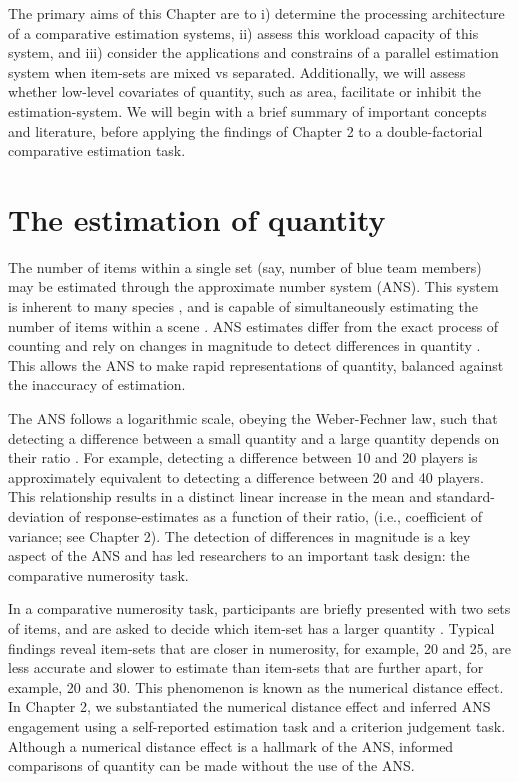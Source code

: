 The primary aims of this Chapter are to i) determine the processing architecture of a comparative estimation systems, ii) assess this workload capacity of this system, and iii) consider the applications and constrains of a parallel estimation system when item-sets are mixed vs separated. Additionally, we will assess whether low-level covariates of quantity, such as area, facilitate or inhibit the estimation-system. We will begin with a brief summary of important concepts and literature, before applying the findings of Chapter 2 to a double-factorial comparative estimation task. 

\section{The estimation of quantity}
The number of items within a single set (say, number of blue team members) may be estimated through the approximate number system (ANS). This system is inherent to many species \cite{woodruff1981primative,pepperberg2005number,agrillo2008fish,dehaene2011NumSense}, and is capable of simultaneously estimating the number of items within a scene \cite{gallistel1992ANS,dehaene2011NumSense}. ANS estimates differ from the exact process of counting and rely on changes in magnitude to detect differences in quantity \cite{gallistel1992ANS}. This allows the ANS to make rapid representations of quantity, balanced against the inaccuracy of estimation. 

The ANS follows a logarithmic scale, obeying the Weber-Fechner law, such that detecting a difference between a small quantity and a large quantity depends on their ratio \cite{fechner1860}. For example, detecting a difference between 10 and 20 players is approximately equivalent to detecting a difference between 20 and 40 players. This relationship results in a distinct linear increase in the mean and standard-deviation of response-estimates as a function of their ratio, (i.e., coefficient of variance; see Chapter 2). The detection of differences in magnitude is a key aspect of the ANS and has led researchers to an important task design: the comparative numerosity task.

In a comparative numerosity task, participants are briefly presented with two sets of items, and are asked to decide which item-set has a larger quantity \cite{piazza2004,price2012,libertus2016, leibovich2014comparing,pansky2002comparative}. Typical findings reveal item-sets that are closer in numerosity, for example, 20 and 25, are less accurate and slower to estimate than item-sets that are further apart, for example, 20 and 30. This phenomenon is known as the numerical distance effect. In Chapter 2, we substantiated the numerical distance effect and inferred ANS engagement using a self-reported estimation task and a criterion judgement task. Although a numerical distance effect is a hallmark of the ANS, informed comparisons of quantity can be made without the use of the ANS.

